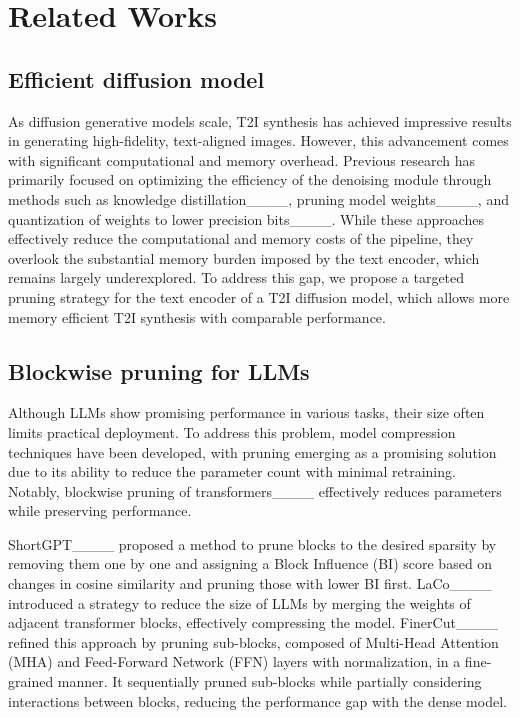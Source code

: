 \section{Related Works}
\label{related_works}
\subsection{Efficient diffusion model}
As diffusion generative models scale, T2I synthesis has achieved impressive results in generating high-fidelity, text-aligned images. However, this advancement comes with significant computational and memory overhead. Previous research has primarily focused on optimizing the efficiency of the denoising module through methods such as knowledge distillation____, pruning model weights____, and quantization of weights to lower precision bits____. While these approaches effectively reduce the computational and memory costs of the pipeline, they overlook the substantial memory burden imposed by the text encoder, which remains largely underexplored. To address this gap, we propose a targeted pruning strategy for the text encoder of a T2I diffusion model, which allows more memory efficient T2I synthesis with comparable performance.

\subsection{Blockwise pruning for LLMs}
Although LLMs show promising performance in various tasks, their size often limits practical deployment. To address this problem, model compression techniques have been developed, with pruning emerging as a promising solution due to its ability to reduce the parameter count with minimal retraining. Notably, blockwise pruning of transformers____ effectively reduces parameters while preserving performance.

ShortGPT____ proposed a method to prune blocks to the desired sparsity by removing them one by one and assigning a Block Influence (BI) score based on changes in cosine similarity and pruning those with lower BI first. LaCo____ introduced a strategy to reduce the size of LLMs by merging the weights of adjacent transformer blocks, effectively compressing the model. FinerCut____ refined this approach by pruning sub-blocks, composed of Multi-Head Attention (MHA) and Feed-Forward Network (FFN) layers with normalization, in a fine-grained manner. It sequentially pruned sub-blocks while partially considering interactions between blocks, %
reducing the performance gap with the dense model.

